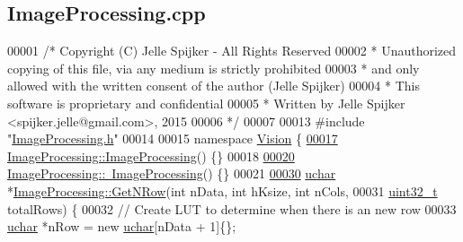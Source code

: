 \hypertarget{_image_processing_8cpp_source}{}\subsection{Image\+Processing.\+cpp}
\label{_image_processing_8cpp_source}

\begin{DoxyCode}
00001 \textcolor{comment}{/* Copyright (C) Jelle Spijker - All Rights Reserved}
00002 \textcolor{comment}{ * Unauthorized copying of this file, via any medium is strictly prohibited}
00003 \textcolor{comment}{ * and only allowed with the written consent of the author (Jelle Spijker)}
00004 \textcolor{comment}{ * This software is proprietary and confidential}
00005 \textcolor{comment}{ * Written by Jelle Spijker <spijker.jelle@gmail.com>, 2015}
00006 \textcolor{comment}{ */}
00007 
00013 \textcolor{preprocessor}{#include "\hyperlink{_image_processing_8h}{ImageProcessing.h}"}
00014 
00015 \textcolor{keyword}{namespace }\hyperlink{namespace_vision}{Vision} \{
\hypertarget{_image_processing_8cpp_source_l00017}{}\hyperlink{class_vision_1_1_image_processing_a0090ffe36a912d6df5d7a1f507f6252e}{00017} \hyperlink{class_vision_1_1_image_processing_a0090ffe36a912d6df5d7a1f507f6252e}{ImageProcessing::ImageProcessing}() \{\}
00018 
\hypertarget{_image_processing_8cpp_source_l00020}{}\hyperlink{class_vision_1_1_image_processing_a1d4bd00ec1862112552c663034cebabc}{00020} \hyperlink{class_vision_1_1_image_processing_a1d4bd00ec1862112552c663034cebabc}{ImageProcessing::~ImageProcessing}() \{\}
00021 
\hypertarget{_image_processing_8cpp_source_l00030}{}\hyperlink{class_vision_1_1_image_processing_a56e17515a15eb7d246985e550fc89610}{00030} \hyperlink{_soil_math_types_8h_a65f85814a8290f9797005d3b28e7e5fc}{uchar} *\hyperlink{class_vision_1_1_image_processing_a56e17515a15eb7d246985e550fc89610}{ImageProcessing::GetNRow}(\textcolor{keywordtype}{int} nData, \textcolor{keywordtype}{int} hKsize, \textcolor{keywordtype}{int} nCols,
00031                                 \hyperlink{_soil_math_types_8h_a435d1572bf3f880d55459d9805097f62}{uint32\_t} totalRows) \{
00032   \textcolor{comment}{// Create LUT to determine when there is an new row}
00033   \hyperlink{_soil_math_types_8h_a65f85814a8290f9797005d3b28e7e5fc}{uchar} *nRow = \textcolor{keyword}{new} \hyperlink{_soil_math_types_8h_a65f85814a8290f9797005d3b28e7e5fc}{uchar}[nData + 1]\{\};

\end{DoxyCode}
